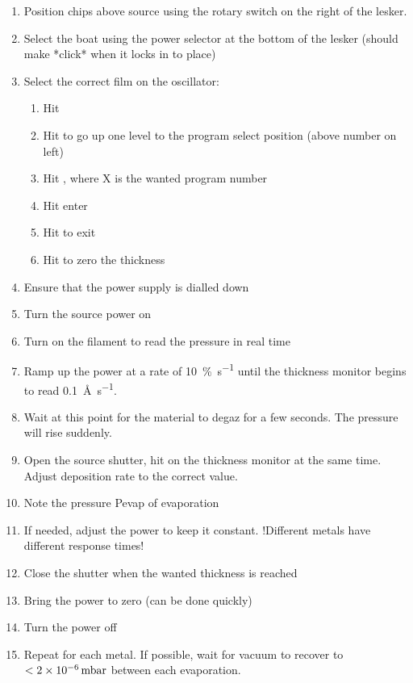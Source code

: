 \documentclass[12pt,a4paper]{report}
\begin{document}
\begin{enumerate}[resume]
\item Position chips above source using the rotary switch on the right of the lesker.
\item Select the boat using the power selector at the bottom of the lesker (should make *click* when it locks in to place)
\item Select the correct film on the oscillator:
\begin{enumerate}
  \item Hit 
  \item Hit  to go up one level to the program select position (above number on left)
  \item Hit , where X is the wanted program number
  \item Hit enter 
  \item Hit  to exit
  \item Hit  to zero the thickness
\end{enumerate}
\item Ensure that the power supply is dialled down
\item Turn the source power on
\item Turn on the filament to read the pressure in real time
\item Ramp up the power at a rate of \SI{10}{\percent\per\second} until the thickness monitor begins to read \SI{0.1}{\angstrom\per\second}.
\item Wait at this point for the material to degaz for a few seconds. The pressure will rise suddenly.
\item Open the source shutter, hit  on the thickness monitor at the same time. Adjust deposition rate to the correct value. 
\item Note the pressure Pevap of evaporation
\item If needed, adjust the power to keep it constant. !Different metals have different response times! 
\item Close the shutter when the wanted thickness is reached
\item Bring the power to zero (can be done quickly)
\item Turn the power off
\item Repeat for each metal. If possible, wait for vacuum to recover to $< \SI{2d-6}{\milli\bar}$ between each evaporation.
\end{enumerate}
\end{document}
